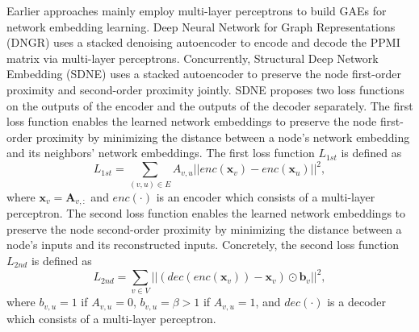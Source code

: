     Earlier approaches mainly employ multi-layer perceptrons to build GAEs for network embedding learning. Deep Neural Network for Graph Representations (DNGR) \cite{cao2016deep} uses a stacked denoising autoencoder \cite{vincent2008extracting} to encode and decode the PPMI matrix via multi-layer perceptrons. 
	Concurrently, Structural Deep Network Embedding (SDNE) \cite{wang2016sdne} uses a stacked autoencoder to preserve the node first-order proximity and second-order proximity jointly. SDNE proposes two loss functions on the outputs of the encoder and the outputs of the decoder separately. The first loss function enables the learned network embeddings to preserve the node first-order proximity by minimizing the distance between a node's network embedding and its neighbors' network embeddings. The  first loss function $L_{1st}$ is defined as 
	\begin{equation}
	L_{1st} = \sum_{(v,u)\in E} A_{v,u}||enc(\mathbf{x}_v)-enc(\mathbf{x}_u)||^2,
	\end{equation}
	where $\mathbf{x}_v=\mathbf{A}_{v,:}$ and $enc(\cdot)$ is an encoder which consists of a multi-layer perceptron. The second loss function enables the learned network embeddings to preserve the node second-order proximity by minimizing the distance between a node's inputs and its reconstructed inputs. Concretely, the second loss function $L_{2nd}$ is defined as 
	\begin{equation}
	L_{2nd} = \sum_{v \in V} ||(dec(enc(\mathbf{x}_v))-\mathbf{x}_v)\odot \mathbf{b}_v||^2,
	\end{equation}
	where  $b_{v,u}=1$ if $A_{v,u}=0$, $b_{v,u}=\beta>1$ if $A_{v,u}=1$, and $dec(\cdot)$ is a decoder which consists of a multi-layer perceptron. 
	
